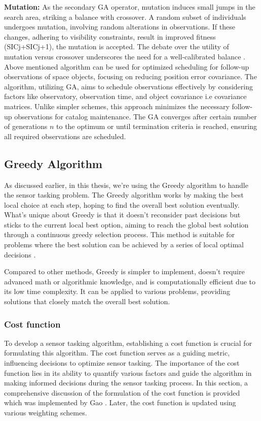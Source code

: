 \textbf{Mutation:} As the secondary GA operator, mutation induces small jumps in the search area, striking a balance with crossover. A random subset of individuals undergoes mutation, involving random alterations in observations. If these changes, adhering to visibility constraints, result in improved fitness (SICj+SICj+1), the mutation is accepted. The debate over the utility of mutation versus crossover underscores the need for a well-calibrated balance \cite{hinze1}.\\


Above mentioned algorithm can be used for optimized scheduling for follow-up observations of space objects, focusing on reducing position error covariance. The algorithm, utilizing GA, aims to schedule observations effectively by considering factors like observatory, observation time, and object covariance i.e covariance matrices. Unlike simpler schemes, this approach minimizes the necessary follow-up observations for catalog maintenance. The GA converges after certain number of generations $n$ to the optimum or until termination criteria is reached, ensuring all required observations are scheduled.

\subsection{Greedy Algorithm}

As discussed earlier, in this thesis, we're using the Greedy algorithm to handle the sensor tasking problem. The Greedy algorithm works by making the best local choice at each step, hoping to find the overall best solution eventually. What's unique about Greedy is that it doesn't reconsider past decisions but sticks to the current local best option, aiming to reach the global best solution through a continuous greedy selection process. This method is suitable for problems where the best solution can be achieved by a series of local optimal decisions \cite{fruh2,gao}.

Compared to other methods, Greedy is simpler to implement, doesn't require advanced math or algorithmic knowledge, and is computationally efficient due to its low time complexity. It can be applied to various problems, providing solutions that closely match the overall best solution\cite{fruh2}.

\subsubsection{Cost function}\label{sec:cost}
To develop a sensor tasking algorithm, establishing a cost function is crucial for formulating this algorithm. The cost function serves as a guiding metric, influencing decisions to optimize sensor tasking. The importance of the cost function lies in its ability to quantify various factors and guide the algorithm in making informed decisions during the sensor tasking process. In this section, a comprehensive discussion of the formulation of the cost function is provided which was implemented by Gao \cite{gao}. Later, the cost function is updated using various weighting schemes.

